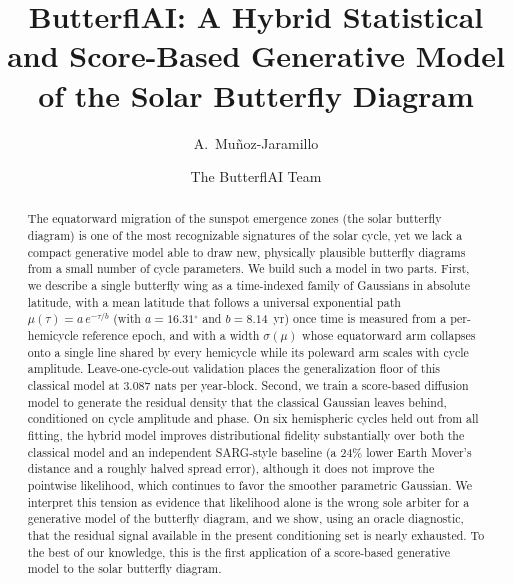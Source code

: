 \documentclass[twocolumn]{aastex631}
\newcommand{\degr}{\ensuremath{^{\circ}}}
\begin{document}
\title{ButterflAI: A Hybrid Statistical and Score-Based Generative Model
of the Solar Butterfly Diagram}

\author{A.~Mu\~noz-Jaramillo}

\author{The ButterflAI Team}

\begin{abstract}
The equatorward migration of the sunspot emergence zones (the solar butterfly
diagram) is one of the most recognizable signatures of the solar cycle, yet
we lack a compact generative model able to draw new, physically plausible
butterfly diagrams from a small number of cycle parameters. We build such a
model in two parts. First, we describe a single butterfly wing as a
time-indexed family of Gaussians in absolute latitude, with a mean latitude
that follows a universal exponential path $\mu(\tau)=a\,e^{-\tau/b}$ (with
$a=16.31\degr$ and $b=8.14$~yr) once time is measured from a per-hemicycle
reference epoch, and with a width $\sigma(\mu)$ whose equatorward arm collapses
onto a single line shared by every hemicycle while its poleward arm scales with
cycle amplitude. Leave-one-cycle-out validation places the generalization floor
of this classical model at $3.087$ nats per year-block. Second, we train a
score-based diffusion model to generate the residual density that the classical
Gaussian leaves behind, conditioned on cycle amplitude and phase. On six
hemispheric cycles held out from all fitting, the hybrid model improves
distributional fidelity substantially over both the classical model and an
independent SARG-style baseline (a $24\%$ lower Earth Mover's distance and a
roughly halved spread error), although it does not improve the pointwise
likelihood, which continues to favor the smoother parametric Gaussian. We
interpret this tension as evidence that likelihood alone is the wrong sole
arbiter for a generative model of the butterfly diagram, and we show, using an
oracle diagnostic, that the residual signal available in the present
conditioning set is nearly exhausted. To the best of our knowledge, this is the
first application of a score-based generative model to the solar butterfly
diagram.
\end{abstract}


\end{document}
